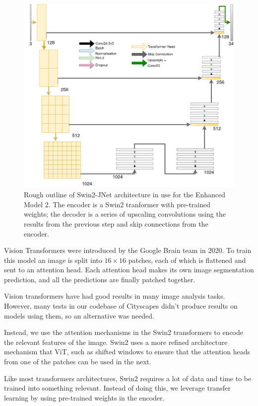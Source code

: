 \begin{figure}
	\centering
	\includegraphics[height=.4\textheight]{Swin2_JNet}
	\caption{Rough outline of Swin2-JNet architecture in use for the Enhanced Model 2. The encoder is a Swin2 tranformer with pre-trained weights; the decoder is a series of upscaling convolutions using the results from the previous step and skip connections from the encoder.}
	\label{swin2}
\end{figure}

Vision Transformers were introduced by the Google Brain team in 2020\cite{vision_transformers}.
To train this model an image is split into $16 \times 16$ patches, each of which is flattened and sent to an attention head.
Each attention head makes its own image segmentation prediction, and all the predictions are finally patched together.

Vision transformers have had good results in many image analysis tasks\cite{vision_transformers_a_survey}.
However, many tests in our codebase of Cityscapes didn't produce results on models using them, so an alternative was needed.

Instead, we use the attention mechanisms in the Swin2 transformers\cite{swin2} to encode the relevant features of the image.
Swin2 uses a more refined architecture mechanism that ViT, such as shifted windows to ensure that the attention heads from one of the patches can be used in the next.

Like most transformers architectures, Swin2 requires a lot of data and time to be trained into something relevant.
Instead of doing this, we leverage transfer learning by using pre-trained weights in the encoder.

